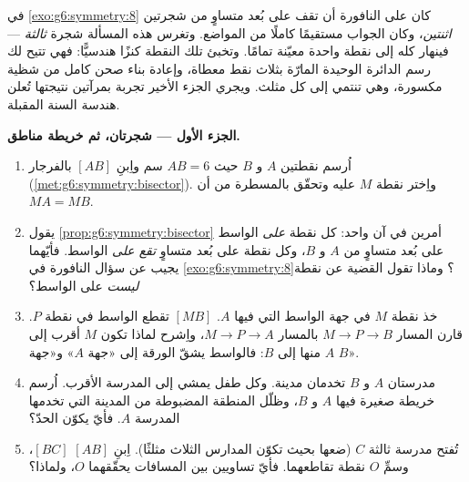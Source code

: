 \begin{problem}
\label{pb:g6:symmetry:1}
في \cref{exo:g6:symmetry:8} كان على النافورة أن تقف على بُعد
متساوٍ من شجرتين \emph{اثنتين}، وكان الجواب مستقيمًا كاملًا من
المواضع. وتغرس هذه المسألة شجرة \emph{ثالثة} --- فينهار 
كله إلى نقطة واحدة معيّنة تمامًا. وتخبئ تلك
النقطة كنزًا هندسيًّا: فهي تتيح لك رسم الدائرة الوحيدة
المارّة بثلاث نقط معطاة، وإعادة بناء صحن كامل
من شظية مكسورة، وهي تنتمي إلى كل مثلث. ويجري الجزء
الأخير تجربة بمرآتين نتيجتها
تُعلن هندسة السنة المقبلة.

\medskip
\noindent\textbf{الجزء الأول --- شجرتان، ثم خريطة
مناطق.}
\begin{enumerate}
  \item اُرسم نقطتين $A$ و $B$ حيث $AB = 6$ سم واِبنِ
          $[AB]$ بالفرجار
        (\cref{met:g6:symmetry:bisector}). واِختر نقطة
        $M$ عليه وتحقّق بالمسطرة من أن $MA = MB$.
  \item يقول \cref{prop:g6:symmetry:bisector} أمرين في
        آن واحد: كل نقطة \emph{على} الواسط على بُعد متساوٍ
        من $A$ و $B$، وكل نقطة على بُعد متساوٍ \emph{تقع
        على} الواسط. فأيّهما يجيب عن سؤال
        النافورة في \cref{exo:g6:symmetry:8}؟ وماذا تقول
        القضية عن نقطة \emph{ليست} على
        الواسط؟
  \item خذ نقطة $M$ في جهة الواسط التي فيها
        $A$.  $[MB]$ تقطع الواسط في نقطة
        $P$. قارن المسار $M \to P \to B$ بالمسار
        $M \to P \to A$، واِشرح لماذا تكون $M$ أقرب إلى $A$
        منها إلى $B$: فالواسط يشقّ الورقة إلى
        «جهة $A$» و«جهة $B$».
  \item مدرستان $A$ و $B$ تخدمان مدينة. وكل طفل يمشي
        إلى المدرسة الأقرب. اُرسم خريطة صغيرة فيها $A$ و $B$،
        وظلّل المنطقة المضبوطة من المدينة التي تخدمها المدرسة
        $A$. فأيّ  يكوّن الحدّ؟
  \item تُفتح مدرسة ثالثة $C$ (ضعها بحيث تكوّن المدارس الثلاث
        مثلثًا). اِبنِ 
         $[AB]$   $[BC]$، وسمِّ
        $O$ نقطة تقاطعهما. فأيّ تساويين بين
        المسافات يحقّقهما $O$، ولماذا؟
\end{enumerate}


\end{problem}

